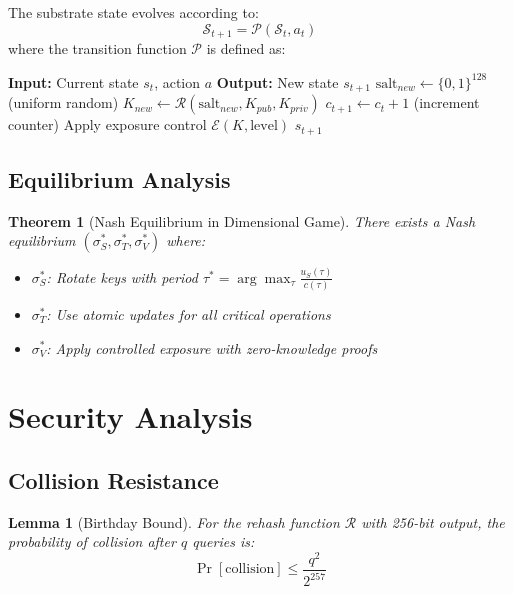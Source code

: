 \documentclass[11pt]{article}
\newtheorem{theorem}{Theorem}
\newtheorem{lemma}{Lemma}
\begin{document}
The substrate state evolves according to:
\[\mathcal{S}_{t+1} = \mathcal{P}(\mathcal{S}_t, a_t)\]
where the transition function $\mathcal{P}$ is defined as:

\begin{algorithm}
\caption{Substrate State Transition}
\begin{algorithmic}
\STATE \textbf{Input:} Current state $s_t$, action $a$
\STATE \textbf{Output:} New state $s_{t+1}$
    \STATE $\text{salt}_{new} \leftarrow \{0,1\}^{128}$ (uniform random)
    \STATE $K_{new} \leftarrow \mathcal{R}(\text{salt}_{new}, K_{pub}, K_{priv})$
    \STATE $c_{t+1} \leftarrow c_t + 1$ (increment counter)
    \STATE Apply exposure control $\mathcal{E}(K, \text{level})$
\ENDIF
\RETURN $s_{t+1}$
\end{algorithmic}
\end{algorithm}

\subsection{Equilibrium Analysis}

\begin{theorem}[Nash Equilibrium in Dimensional Game]
There exists a Nash equilibrium $(\sigma_S^*, \sigma_T^*, \sigma_V^*)$ where:
\begin{itemize}
    \item $\sigma_S^*$: Rotate keys with period $\tau^* = \arg\max_{\tau} \frac{u_S(\tau)}{c(\tau)}$
    \item $\sigma_T^*$: Use atomic updates for all critical operations
    \item $\sigma_V^*$: Apply controlled exposure with zero-knowledge proofs
\end{itemize}
\end{theorem}

\section{Security Analysis}

\subsection{Collision Resistance}

\begin{lemma}[Birthday Bound]
For the rehash function $\mathcal{R}$ with 256-bit output, the probability of collision after $q$ queries is:
\[\Pr[\text{collision}] \leq \frac{q^2}{2^{257}}\]
\end{lemma}
\end{document}

